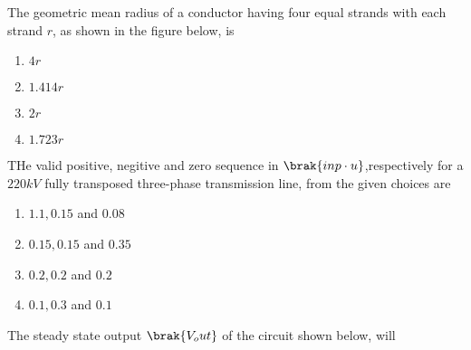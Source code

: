 \iffalse
\chapter{2021}
\author{AI24BTECH11018}
\section{ma}
\fi

\item The geometric mean radius of a conductor having four equal strands with each strand $r$, as shown in the figure below, is
\begin{figure}[!ht]
\centering
{}%

\label{fig:my_label}
\end{figure}
\begin{enumerate}
    \item $4 r$ 
    \item $1.414 r$
    \item $2 r$
    \item $1.723 r$
\end{enumerate}
\item THe valid positive, negitive and zero sequence in $\brak{in p\cdot u}$,respectively for a $220 kV$ fully transposed three-phase transmission line, from the given choices are
\begin{enumerate}
    \item $1.1,0.15$ and $0.08$
    \item $0.15,0.15$ and $0.35$
    \item $0.2,0.2$ and $0.2$
    \item $0.1,0.3$ and $0.1$
\end{enumerate}
\item The steady state output $\brak{V_out}$ of the circuit shown below, will
